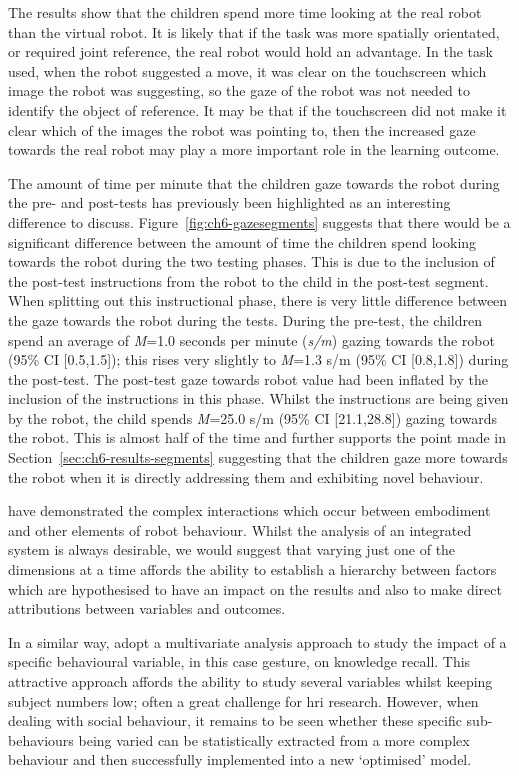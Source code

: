 The results show that the children spend more time looking at the real robot than the virtual robot. It is likely that if the task was more spatially orientated, or required joint reference, the real robot would hold an advantage. In the task used, when the robot suggested a move, it was clear on the touchscreen which image the robot was suggesting, so the gaze of the robot was not needed to identify the object of reference. It may be that if the touchscreen did not make it clear which of the images the robot was pointing to, then the increased gaze towards the real robot may play a more important role in the learning outcome.

The amount of time per minute that the children gaze towards the robot during the pre- and post-tests has previously been highlighted as an interesting difference to discuss. Figure~\ref{fig:ch6-gazesegments} suggests that there would be a significant difference between the amount of time the children spend looking towards the robot during the two testing phases. This is due to the inclusion of the post-test instructions from the robot to the child in the post-test segment. When splitting out this instructional phase, there is very little difference between the gaze towards the robot during the tests. During the pre-test, the children spend an average of \textit{M}=1.0 seconds per minute (\textit{s/m}) gazing towards the robot (95\% CI [0.5,1.5]); this rises very slightly to \textit{M}=1.3 s/m (95\% CI [0.8,1.8]) during the post-test. The post-test gaze towards robot value had been inflated by the inclusion of the instructions in this phase. Whilst the instructions are being given by the robot, the child spends \textit{M}=25.0 s/m (95\% CI [21.1,28.8]) gazing towards the robot. This is almost half of the time and further supports the point made in Section~\ref{sec:ch6-results-segments} suggesting that the children gaze more towards the robot when it is directly addressing them and exhibiting novel behaviour.

\cite{schermerhorn2011disentangling} have demonstrated the complex interactions which occur between embodiment and other elements of robot behaviour. Whilst the analysis of an integrated system is always desirable, we would suggest that varying just one of the dimensions at a time affords the ability to establish a hierarchy between factors which are hypothesised to have an impact on the results and also to make direct attributions between variables and outcomes.

In a similar way, \cite{huang2013modeling} adopt a multivariate analysis approach to study the impact of a specific behavioural variable, in this case gesture, on knowledge recall. This attractive approach affords the ability to study several variables whilst keeping subject numbers low; often a great challenge for \acrshort{hri} research. However, when dealing with social behaviour, it remains to be seen whether these specific sub-behaviours being varied can be statistically extracted from a more complex behaviour and then successfully implemented into a new `optimised' model.


